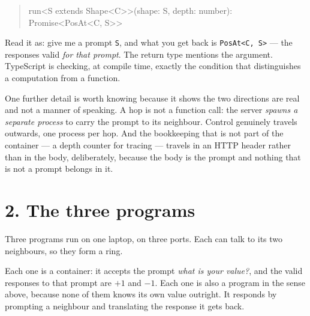 \documentclass[11pt,a4paper]{article}
\begin{document}
\begin{quote}\ttfamily\small
run<S extends Shape<C>{}>(shape: S, depth: number): Promise<PosAt<C, S>{}>
\end{quote}

\noindent
Read it as: give me a prompt \texttt{S}, and what you get back is
\texttt{PosAt<C, S>} --- the responses valid \emph{for that prompt}. The
return type mentions the argument. TypeScript is checking, at compile time,
exactly the condition that distinguishes a computation from a function.

One further detail is worth knowing because it shows the two directions are
real and not a manner of speaking. A hop is not a function call: the server
\emph{spawns a separate process} to carry the prompt to its neighbour. Control
genuinely travels outwards, one process per hop. And the bookkeeping that is
not part of the container --- a depth counter for tracing --- travels in an
HTTP header rather than in the body, deliberately, because the body is the
prompt and nothing that is not a prompt belongs in it.

\section*{2. The three programs}

Three programs run on one laptop, on three ports. Each can talk to its two
neighbours, so they form a ring.

Each one is a container: it accepts the prompt \emph{what is your value?}, and
the valid responses to that prompt are $+1$ and $-1$. Each one is also a
program in the sense above, because none of them knows its own value outright.
It responds by prompting a neighbour and translating the response it gets back.

\begin{center}
\end{center}
\end{document}
